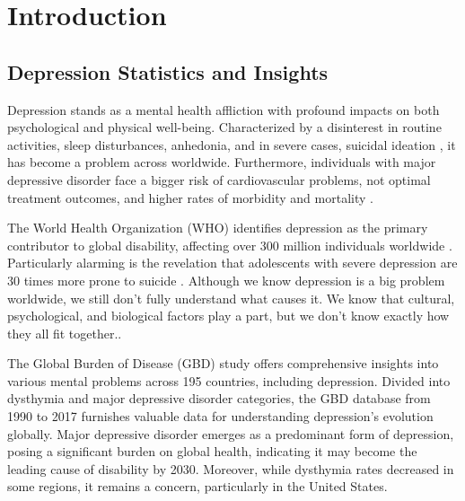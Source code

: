 \chapter{Introduction}

\label{intro}

\section{Depression Statistics and Insights}
\label{sec:ch1sec1}

\par \quad Depression stands as a mental health affliction with profound impacts on both psychological and physical well-being. Characterized by a disinterest in routine activities, sleep disturbances, anhedonia, and in severe cases, suicidal ideation \cite{cui2015systematic}, it has become a problem across worldwide. Furthermore, individuals with major depressive disorder face a bigger risk of cardiovascular problems, not optimal treatment outcomes, and higher rates of morbidity and mortality \cite{seligman2015interface,luo2018effects}.

The World Health Organization (WHO) identifies depression as the primary contributor to global disability, affecting over 300 million individuals worldwide \cite{smith2014world}. Particularly alarming is the revelation that adolescents with severe depression are 30 times more prone to suicide \cite{stringaris2017depression}. 
Although we know depression is a big problem worldwide, we still don't fully understand what causes it. We know that cultural, psychological, and biological factors play a part, but we don't know exactly how they all fit together.\cite{gross2014silver,menard2016pathogenesis}.

The Global Burden of Disease (GBD) study \cite{liu2020changes} offers comprehensive insights into various mental problems across 195 countries, including depression. Divided into dysthymia and major depressive disorder categories, the GBD database from 1990 to 2017 furnishes valuable data for understanding depression's evolution globally. Major depressive disorder emerges as a predominant form of depression, posing a significant burden on global health, indicating it may become the leading cause of disability by 2030. Moreover, while dysthymia rates decreased in some regions, it remains a concern, particularly in the United States.

